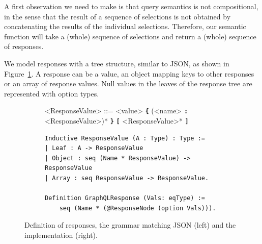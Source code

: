 A first observation we need to make is that query semantics is not compositional, in the sense that the result of a sequence of selections is not obtained by concatenating the results of the individual selections. Therefore, our semantic function will take a (whole) sequence of selections and return a (whole) sequence of responses.  

We model responses with a tree structure, similar to JSON, as shown in Figure~\ref{fig:response_def}. A response can be a value, an object mapping keys to other responses or an array of response values. Null values in the leaves of the response tree are represented with option types.


\begin{figure}[h]
\centering
\begin{subfigure}{.5\textwidth}
    \begin{grammar}
    		<ResponseValue> ::= <value>
		\alt \textbf{\texttt{\{}} (<name> \textbf{\texttt{:}} <ResponseValue>)* \textbf{\texttt{\}}}
		\alt  \textbf{\texttt{[}} <ResponseValue>* \textbf{\texttt{]}}
 \end{grammar}
  \end{subfigure}%
  \begin{subfigure}{.5\textwidth}
\begin{verbatim}
Inductive ResponseValue (A : Type) : Type :=
| Leaf : A -> ResponseValue
| Object : seq (Name * ResponseValue) -> ResponseValue
| Array : seq ResponseValue -> ResponseValue.

Definition GraphQLResponse (Vals: eqType) :=
    seq (Name * (@ResponseNode (option Vals))).
\end{verbatim}
   
  \end{subfigure}
  \caption{Definition of \gql responses, the grammar matching JSON (left) and the \coq implementation (right).}
  \label{fig:response_def}

\end{figure}
%





